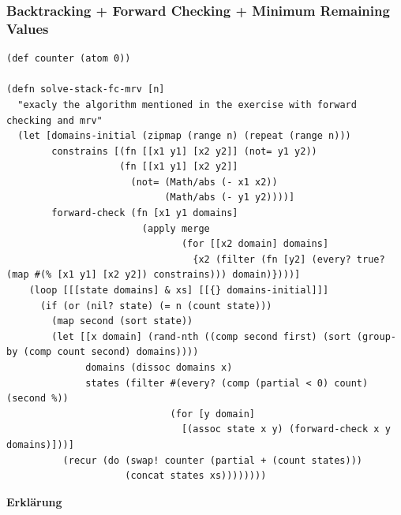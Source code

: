 \documentclass[a4paper,10pt]{article}
\begin{document}
\subsubsection*{Backtracking + Forward Checking + Minimum Remaining Values}
\begin{lstlisting}
(def counter (atom 0))

(defn solve-stack-fc-mrv [n]
  "exacly the algorithm mentioned in the exercise with forward checking and mrv"
  (let [domains-initial (zipmap (range n) (repeat (range n)))
        constrains [(fn [[x1 y1] [x2 y2]] (not= y1 y2))
                    (fn [[x1 y1] [x2 y2]]
                      (not= (Math/abs (- x1 x2))
                            (Math/abs (- y1 y2))))]
        forward-check (fn [x1 y1 domains]
                        (apply merge
                               (for [[x2 domain] domains]
                                 {x2 (filter (fn [y2] (every? true? (map #(% [x1 y1] [x2 y2]) constrains))) domain)})))]
    (loop [[[state domains] & xs] [[{} domains-initial]]]
      (if (or (nil? state) (= n (count state)))
        (map second (sort state))
        (let [[x domain] (rand-nth ((comp second first) (sort (group-by (comp count second) domains))))
              domains (dissoc domains x)
              states (filter #(every? (comp (partial < 0) count) (second %))
                             (for [y domain]
                               [(assoc state x y) (forward-check x y domains)]))]
          (recur (do (swap! counter (partial + (count states)))
                     (concat states xs))))))))
\end{lstlisting}
\textbf{Erklärung}
\end{document}

